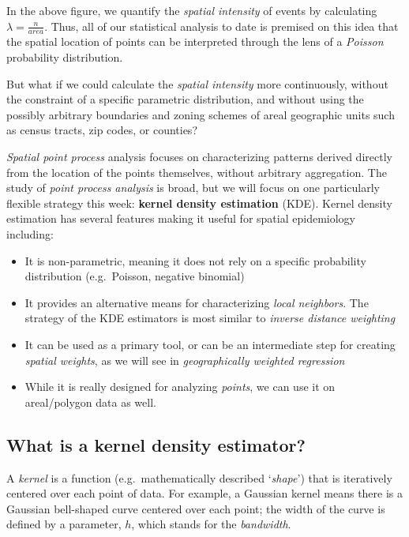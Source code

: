 \documentclass[
]{book}
\providecommand{\tightlist}{%
  \setlength{\itemsep}{0pt}\setlength{\parskip}{0pt}}
\begin{document}
In the above figure, we quantify the \emph{spatial intensity} of events by calculating \(\lambda = \frac{n}{area}\). Thus, all of our statistical analysis to date is premised on this idea that the spatial location of points can be interpreted through the lens of a \emph{Poisson} probability distribution.

But what if we could calculate the \emph{spatial intensity} more continuously, without the constraint of a specific parametric distribution, and without using the possibly arbitrary boundaries and zoning schemes of areal geographic units such as census tracts, zip codes, or counties?

\emph{Spatial point process} analysis focuses on characterizing patterns derived directly from the location of the points themselves, without arbitrary aggregation. The study of \emph{point process analysis} is broad, but we will focus on one particularly flexible strategy this week: \textbf{kernel density estimation} (KDE). Kernel density estimation has several features making it useful for spatial epidemiology including:

\begin{itemize}
\tightlist
\item
  It is non-parametric, meaning it does not rely on a specific probability distribution (e.g.~Poisson, negative binomial)
\item
  It provides an alternative means for characterizing \emph{local neighbors}. The strategy of the KDE estimators is most similar to \emph{inverse distance weighting}
\item
  It can be used as a primary tool, or can be an intermediate step for creating \emph{spatial weights}, as we will see in \emph{geographically weighted regression}
\item
  While it is really designed for analyzing \emph{points}, we can use it on areal/polygon data as well.
\end{itemize}

\hypertarget{what-is-a-kernel-density-estimator}{%
\subsection{What is a kernel density estimator?}\label{what-is-a-kernel-density-estimator}}

A \emph{kernel} is a function (e.g.~mathematically described `\emph{shape}') that is iteratively centered over each point of data. For example, a Gaussian kernel means there is a Gaussian bell-shaped curve centered over each point; the width of the curve is defined by a parameter, \(h\), which stands for the \emph{bandwidth}.
\end{document}
